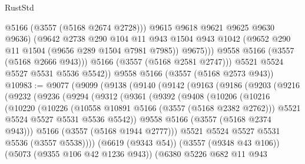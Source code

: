\begin{lexlean}{RustStd}
\begin{coremodule}
                    @5166
                    (@3557 (@5168 @2674 @2728)))
                  @9615
                  @9618
                  @9621
                  @9625
                  @9630
                  @9636)
                (@9642
                  @2738
                  @290
                  @104
                  @11
                  @943
                  @1504
                  @943
                  @1042
                  (@9652 @290 @11 @1504 (@9656 @289 @1504 @7981 @7985))
                  @9675)))
            @9558
            @5166
            (@3557 (@5168 @2666 @943)))
          @5166
          (@3557 (@5168 @2581 @2747)))
        @5521
        @5524
        @5527
        @5531
        @5536
        @5542))
    @9558
    @5166
    (@3557 (@5168 @2573 @943))
@10983 := @9077
    (@9099
      (@9138
        (@9140
          (@9142
            (@9163
              (@9186
                (@9203
                  (@9216
                    (@9232
                      (@9236
                        (@9294
                          (@9312
                            (@9361
                              (@9392
                                (@9408
                                  (@10206
                                    (@10216
                                      (@10220
                                        (@10226
                                          (@10558 @10891 @5166 (@3557 (@5168 @2382 @2762)))
                                          @5521
                                          @5524
                                          @5527
                                          @5531
                                          @5536
                                          @5542))
                                      @9558
                                      @5166
                                      (@3557 (@5168 @2374 @943)))
                                    @5166
                                    (@3557 (@5168 @1944 @2777)))
                                  @5521
                                  @5524
                                  @5527
                                  @5531
                                  @5536
                                  (@3557 @5538))))
                            (@6619 (@9343 @54))
                            (@3557 (@9348 @43 @106))
                            (@5073 (@9355 @106 @42 @1236 @943))
                            (@6380
                              @5226
                              @682
                              @11
                              @943

\end{coremodule}
\end{lexlean}
